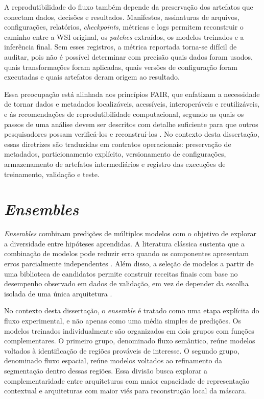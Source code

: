 A reprodutibilidade do fluxo também depende da preservação dos artefatos que
conectam dados, decisões e resultados. Manifestos, assinaturas de arquivos,
configurações, relatórios, \textit{checkpoints}, métricas e logs permitem
reconstruir o caminho entre a WSI original, os \textit{patches} extraídos, os
modelos treinados e a inferência final. Sem esses registros, a métrica reportada
torna-se difícil de auditar, pois não é possível determinar com precisão quais
dados foram usados, quais transformações foram aplicadas, quais versões de
configuração foram executadas e quais artefatos deram origem ao resultado.

Essa preocupação está alinhada aos princípios FAIR, que enfatizam a necessidade
de tornar dados e metadados localizáveis, acessíveis, interoperáveis e
reutilizáveis, e às recomendações de reprodutibilidade computacional, segundo as
quais os passos de uma análise devem ser descritos com detalhe suficiente para
que outros pesquisadores possam verificá-los e reconstruí-los
\cite{wilkinson2016fair,piccolo2016tools}. No contexto desta dissertação, essas
diretrizes são traduzidas em contratos operacionais: preservação de metadados,
particionamento explícito, versionamento de configurações, armazenamento de
artefatos intermediários e registro das execuções de treinamento, validação e
teste.

\section{\textit{Ensembles}}
\label{sec:ensembles_revisao}

\textit{Ensembles} combinam predições de múltiplos modelos com o objetivo de
explorar a diversidade entre hipóteses aprendidas. A literatura clássica sustenta
que a combinação de modelos pode reduzir erro quando os componentes apresentam
erros parcialmente independentes \cite{dietterich2000ensemble}. Além disso, a
seleção de modelos a partir de uma biblioteca de candidatos permite construir
receitas finais com base no desempenho observado em dados de validação, em vez
de depender da escolha isolada de uma única arquitetura \cite{caruana2004ensemble}.

No contexto desta dissertação, o \textit{ensemble} é tratado como uma etapa
explícita do fluxo experimental, e não apenas como uma média simples de
predições. Os modelos treinados individualmente são organizados em dois grupos
com funções complementares. O primeiro grupo, denominado fluxo semântico, reúne
modelos voltados à identificação de regiões prováveis de interesse. O segundo
grupo, denominado fluxo espacial, reúne modelos voltados ao refinamento da
segmentação dentro dessas regiões. Essa divisão busca explorar a
complementaridade entre arquiteturas com maior capacidade de representação
contextual e arquiteturas com maior viés para reconstrução local da máscara.

